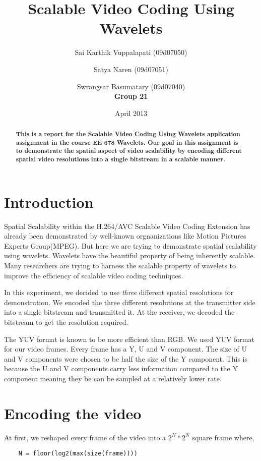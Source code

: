 \documentclass[10pt,twocolumn]{article}
\title{Scalable Video Coding Using Wavelets}
\author{Sai Karthik Vuppalapati (09d07050) \\
\and Satya Naren (09d07051) \\
\and Swrangsar Basumatary (09d07040) \\
\textbf{Group 21}}
\date{April 2013}
\begin{document}
\maketitle

\begin{abstract}
    \textbf{This is a report for the Scalable Video Coding Using Wavelets application assignment in the course EE 678 Wavelets. Our goal in this assignment is to demonstrate the spatial aspect of video scalability by encoding different spatial video resolutions into a single bitstream in a scalable manner.}
\end{abstract}

\section{Introduction}

Spatial Scalability within the H.264/AVC Scalable Video Coding Extension has already been demonstrated\cite{segall2007} by well-known orgnanizations like Motion Pictures Experts Group(MPEG). But here we are trying to demonstrate spatial scalability using wavelets\cite{daubechies1990, daubechies1996}. Wavelets have the beautiful property of being inherently scalable. Many researchers are trying to harness the scalable property of wavelets to improve the efficiency of scalable video coding techniques\cite{signoroni2007}.

In this experiment, we decided to use \emph{three} different spatial resolutions for demonstration. We encoded the three different resolutions at the transmitter side into a single bitstream and transmitted it. At the receiver, we decoded the bitstream to get the resolution required.

The YUV format is known to be more efficient than RGB. We used YUV format for our video frames. Every frame has a Y, U and V component. The size of U and V components were chosen to be half the size of the Y component. This is because the U and V components carry less information compared to the Y component meaning they be can be sampled at a relatively lower rate.

\section{Encoding the video}

At first, we reshaped every frame of the video into a $2^N * 2^N$ square frame where,
\begin{verbatim}
    N = floor(log2(max(size(frame))))
\end{verbatim}
\end{document}
